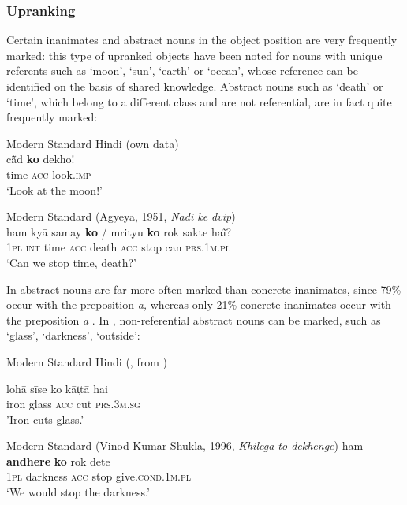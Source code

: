 \documentclass[output=paper]{LSP/langsci}
\begin{document}
\subsubsection{Upranking}\label{10-mo-sec:2-2-2}
Certain inanimates and abstract nouns in the object position are very frequently marked: this type of upranked objects have been noted for nouns with unique referents such as ‘moon’, ‘sun’, ‘earth’ or ‘ocean’, whose reference can be identified on the basis of shared knowledge. Abstract nouns such as ‘death’ or ‘time’, which belong to a different class and are not referential, are in fact quite frequently marked:

\ea Modern Standard Hindi (own data)\\ %
\gll cā̃d  \textbf{ko} dekho!\\
 time \textsc{acc} look\textsc{.imp}\\
\glt ‘Look at the moon!’
\z 


\ea Modern Standard  (Agyeya, 1951, \emph{Nadi ke dvip})\\ %
\gll ham kyā samay \textbf{ko} / mrityu \textbf{ko} rok sakte haĩ?\\
\textsc{1pl} \textsc{int} time \textsc{acc} { } death \textsc{acc} stop can \textsc{prs.1m.pl}\\
\glt ‘Can we stop time, death?’
\z


In  abstract nouns are far more often marked than concrete inanimates, since 79\% occur with the preposition \textit{a,} whereas only 21\% concrete inanimates occur with the preposition \textit{a} \citep[209]{Company2002Grammaticalization}. In , non-referential abstract nouns can be marked, such as ‘glass’, ‘darkness’, ‘outside’:

\ea Modern Standard Hindi (\citealt{Self2012Differential}, from \citealt{Burton1957Compound})  \label{10-mo-ex:8}

\gll lohā sīse ko kāt̩tā hai\\
 iron glass \textsc{acc} cut \textsc{prs.3m.sg}\\
\glt ’Iron cuts glass.’
\z

\ea Modern Standard  (Vinod Kumar Shukla, 1996, \emph{Khilega to dekhenge}) %
\label{10-mo-ex:9}
\ea 
\gll ham \textbf{andhere} \textbf{ko} rok dete\\
\textsc{1pl} darkness \textsc{acc} stop give\textsc{.cond.1m.pl}\\
\glt ‘We would stop the darkness.’
\end{document}
